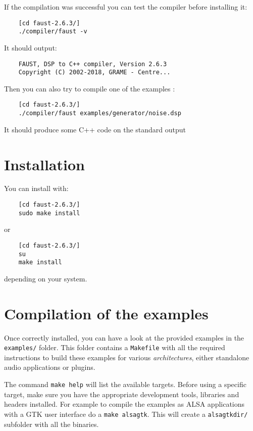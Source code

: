 If the compilation was successful you can test the compiler before installing it:
\begin{lstlisting}
	[cd faust-2.6.3/]
	./compiler/faust -v
\end{lstlisting}
It should output:
\begin{lstlisting}
	FAUST, DSP to C++ compiler, Version 2.6.3
	Copyright (C) 2002-2018, GRAME - Centre... 
\end{lstlisting}

Then you can also try to compile one of the examples :
\begin{lstlisting}
	[cd faust-2.6.3/]
	./compiler/faust examples/generator/noise.dsp
\end{lstlisting}
It should produce some C++ code on the standard output

\section{Installation}
You can install \faust with:
\begin{lstlisting}
	[cd faust-2.6.3/]
	sudo make install
\end{lstlisting}
or
\begin{lstlisting}
	[cd faust-2.6.3/]
	su
	make install
\end{lstlisting}
depending on your system.

\section{Compilation of the examples}
Once \faust correctly installed, you can have a look at the provided examples in the \lstinline'examples/' folder. This folder contains a  \lstinline'Makefile' with all the required instructions to build these examples for various \textit{architectures}, either standalone audio applications or plugins.

The command \lstinline'make help' will list the available targets. Before using a specific target, make sure you have the appropriate development tools, libraries and headers installed. For example to compile the examples as ALSA applications with a GTK user interface do a \lstinline'make alsagtk'. This will create a \lstinline'alsagtkdir/' subfolder with all the binaries. 

